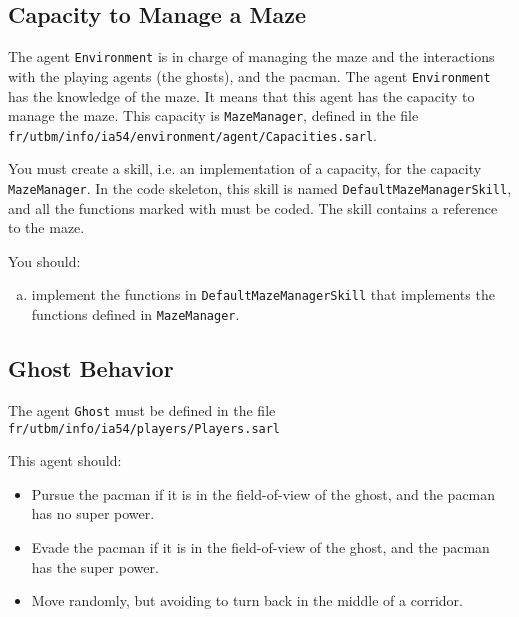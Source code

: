 \documentclass[article,english,nodocumentinfo]{utbmciadreport}
\begin{document}
\subsection{Capacity to Manage a Maze}

The agent \texttt{Environment} is in charge of managing the maze and the interactions with the playing agents (the ghosts), and the pacman.
The agent \texttt{Environment} has the knowledge of the maze. 
It means that this agent has the capacity to manage the maze.
This capacity is \texttt{MazeManager}, defined in the file \texttt{fr/utbm/info/ia54/environment/agent/Capacities.sarl}.


You must create a skill, i.e. an implementation of a capacity, for the capacity \texttt{MazeManager}.
In the code skeleton, this skill is named \texttt{DefaultMazeManagerSkill}, and all the functions marked with  must be coded.
The skill contains a reference to the maze.

You should:
\begin{enumerate}[a)]
\item implement the functions in \texttt{DefaultMazeManagerSkill} that implements the functions defined in \texttt{MazeManager}.
\end{enumerate}

\subsection{Ghost Behavior}

The agent \texttt{Ghost} must be defined in the file \texttt{fr/utbm/info/ia54/players/Players.sarl}

This agent should:
\begin{itemize}
\item Pursue the pacman if it is in the field-of-view of the ghost, and the pacman has no super power.
\item Evade the pacman if it is in the field-of-view of the ghost, and the pacman has the super power.
\item Move randomly, but avoiding to turn back in the middle of a corridor.
\end{itemize}
\end{document}
